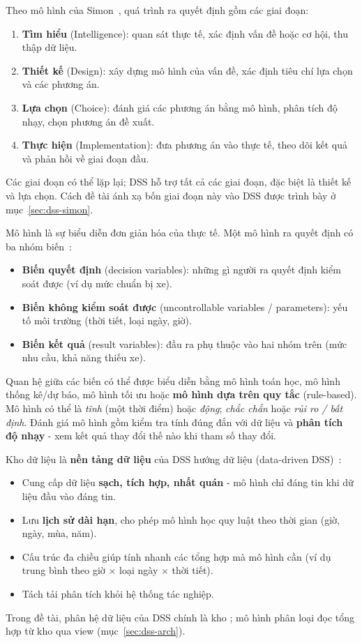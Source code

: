 \label{sec:theory-simon}
Theo mô hình của Simon~\cite{simon,turban}, quá trình ra quyết định gồm các giai đoạn:
\begin{enumerate}
    \item \textbf{Tìm hiểu} (Intelligence): quan sát thực tế, xác định vấn đề hoặc cơ hội, thu thập dữ liệu.
    \item \textbf{Thiết kế} (Design): xây dựng mô hình của vấn đề, xác định tiêu chí lựa chọn và các phương án.
    \item \textbf{Lựa chọn} (Choice): đánh giá các phương án bằng mô hình, phân tích độ nhạy, chọn phương án đề xuất.
    \item \textbf{Thực hiện} (Implementation): đưa phương án vào thực tế, theo dõi kết quả và phản hồi về giai đoạn đầu.
\end{enumerate}
Các giai đoạn có thể lặp lại; DSS hỗ trợ tất cả các giai đoạn, đặc biệt là thiết kế và lựa chọn. Cách đề tài ánh xạ bốn giai đoạn này vào DSS được trình bày ở mục~\ref{sec:dss-simon}.

\label{sec:theory-model}
Mô hình là sự biểu diễn đơn giản hóa của thực tế. Một mô hình ra quyết định có ba nhóm biến~\cite{turban}:
\begin{itemize}
    \item \textbf{Biến quyết định} (decision variables): những gì người ra quyết định kiểm soát được (ví dụ mức chuẩn bị xe).
    \item \textbf{Biến không kiểm soát được} (uncontrollable variables / parameters): yếu tố môi trường (thời tiết, loại ngày, giờ).
    \item \textbf{Biến kết quả} (result variables): đầu ra phụ thuộc vào hai nhóm trên (mức nhu cầu, khả năng thiếu xe).
\end{itemize}
Quan hệ giữa các biến có thể được biểu diễn bằng mô hình toán học, mô hình thống kê/dự báo, mô hình tối ưu hoặc \textbf{mô hình dựa trên quy tắc} (rule-based). Mô hình có thể là \textit{tĩnh} (một thời điểm) hoặc \textit{động}; \textit{chắc chắn} hoặc \textit{rủi ro / bất định}. Đánh giá mô hình gồm kiểm tra tính đúng đắn với dữ liệu và \textbf{phân tích độ nhạy} - xem kết quả thay đổi thế nào khi tham số thay đổi.

\label{sec:theory-role}
Kho dữ liệu là \textbf{nền tảng dữ liệu} của DSS hướng dữ liệu (data-driven DSS)~\cite{sharda}:
\begin{itemize}
    \item Cung cấp dữ liệu \textbf{sạch, tích hợp, nhất quán} - mô hình chỉ đáng tin khi dữ liệu đầu vào đáng tin.
    \item Lưu \textbf{lịch sử dài hạn}, cho phép mô hình học quy luật theo thời gian (giờ, ngày, mùa, năm).
    \item Cấu trúc đa chiều giúp tính nhanh các tổng hợp mà mô hình cần (ví dụ trung bình theo giờ $\times$ loại ngày $\times$ thời tiết).
    \item Tách tải phân tích khỏi hệ thống tác nghiệp.
\end{itemize}
Trong đề tài, phân hệ dữ liệu của DSS chính là kho ; mô hình phân loại đọc tổng hợp từ kho qua view  (mục~\ref{sec:dss-arch}).

